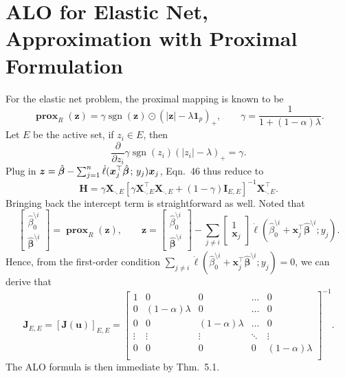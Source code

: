 \documentclass[11pt]{article}
\newcommand{\bx}{\bm{x}}
\newcommand{\bz}{\bm{z}}
\newcommand{\bH}{\bm{H}}
\newcommand{\bI}{\bm{I}}
\newcommand{\bX}{\bm{X}}
\newcommand{\bbeta}{\bm{\beta}}
\newcommand{\semicol}{\nobreak\mskip2mu\mathpunct{}\nonscript\mkern-\thinmuskip{;}\mskip6muplus1mu\relax}
\DeclareMathOperator{\sign}{sgn}
\DeclareMathOperator{\bprox}{\mathbf{prox}}
\newcommand{\refthm}[2]{#1~#2}
\begin{document}
\section{ALO for Elastic Net, Approximation with Proximal Formulation}
For the elastic net problem, the proximal mapping is known to be \[\bprox_R\left(\bz\right)=\gamma\sign(\bz)\odot(|\bz|-\lambda\bm{1}_p)_+,\qquad\gamma=\frac{1}{1+(1-\alpha)\lambda}.\] Let \(E\) be the active set, if \(z_i\in E\), then \[\frac{\partial}{\partial z_i}\gamma\sign(z_i)(|z_i|-\lambda)_+=\gamma.\] Plug in \(\bz=\hat{\bbeta}-\sum_{j=1}^{n}\dot{\ell}(\bx_j^\top\hat{\bbeta}\semicol y_j)\bx_j\), \refthm{Eqn.}{46} thus reduce to \[\bH=\gamma\bX_{\cdot,E}\left[\gamma\bX_{\cdot,E}^\top\bX_{\cdot,E}+\left(1-\gamma\right)\bI_{E,E}\right]^{-1}\bX_{\cdot,E}^\top.\]
Bringing back the intercept term is straightforward as well. Noted that \[\begin{bmatrix}
\hat{\beta}_0^{\setminus i} \\
\hat{\bm{\beta}}^{\setminus i}\end{bmatrix}=
\bprox_{R}\left(\bz\right),\qquad\bz=\begin{bmatrix}
\hat{\beta}_0^{\setminus i} \\
\hat{\bm{\beta}}^{\setminus i}\end{bmatrix}-
\sum_{j\neq i}\begin{bmatrix}
1 \\
\bm{x}_j\end{bmatrix}
\dot{\ell}\left(\hat{\beta}_0^{\setminus i}+\bm{x}_j^\top\hat{\bm{\beta}}^{\setminus i};y_j\right).\] Hence, from the first-order condition \(\sum_{j\neq i}\dot{\ell}\left(\hat{\beta}_0^{\setminus i}+\bm{x}_j^\top\hat{\bm{\beta}}^{\setminus i};y_j\right)=0\), we can derive that \[\bm{J}_{E,E}=
\left[\bm{J}(\bm{u})\right]_{E,E}=
\begin{bmatrix}
1 & 0 & 0 & \dots & 0\\
0 & (1-\alpha)\lambda & 0 & \dots & 0\\
0 & 0 & (1-\alpha)\lambda & \dots & 0\\
\vdots & \vdots & \vdots & \ddots & \vdots\\
0 & 0 & 0 & 0 & (1-\alpha)\lambda\\
\end{bmatrix}^{-1}.\] The ALO formula is then immediate by \refthm{Thm.}{5.1}.
\end{document}
